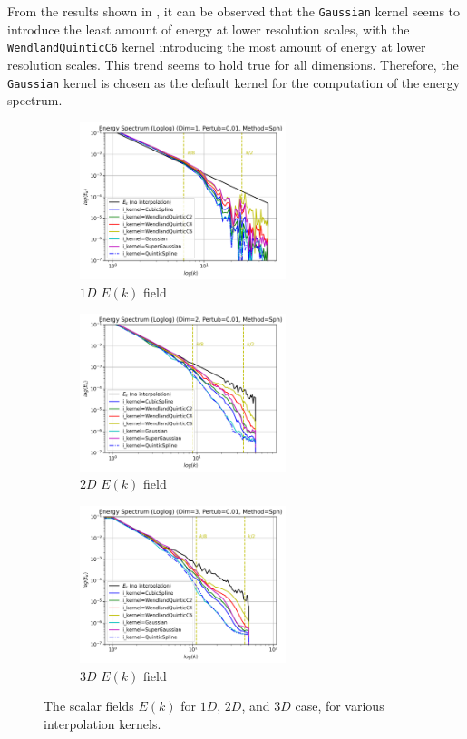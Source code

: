 From the results shown in , it can be observed that the \texttt{Gaussian} kernel seems to introduce the least amount of energy at lower resolution scales, with the \texttt{WendlandQuinticC6} kernel introducing the most amount of energy at lower resolution scales. This trend seems to hold true for all dimensions.
Therefore, the \texttt{Gaussian} kernel is chosen as the default kernel for the computation of the energy spectrum.

\begin{figure}[H]
	\begin{subfigure}{7cm}
		\centering\includegraphics[width=6cm]{Code-Figures/sin-vel-prof-i-kernel/Energy Spectrum (Loglog) (Dim=1, Pertub=0.01, Method=Sph).png}
		\caption{$1D$ $E(k)$ field}
	\end{subfigure}
	\begin{subfigure}{7cm}
		\centering\includegraphics[width=6cm]{Code-Figures/sin-vel-prof-i-kernel/Energy Spectrum (Loglog) (Dim=2, Pertub=0.01, Method=Sph).png}
		\caption{$2D$ $E(k)$ field}
	\end{subfigure}
	\begin{subfigure}{7cm}
		\centering\includegraphics[width=6cm]{Code-Figures/sin-vel-prof-i-kernel/Energy Spectrum (Loglog) (Dim=3, Pertub=0.01, Method=Sph).png}
		\caption{$3D$ $E(k)$ field}
	\end{subfigure}
	\caption{The scalar fields $E(k)$ for $1D$, $2D$, and $3D$ case, for various interpolation kernels.}
	\label{fig:espec-scalar-fields-i-kernels}
\end{figure}

